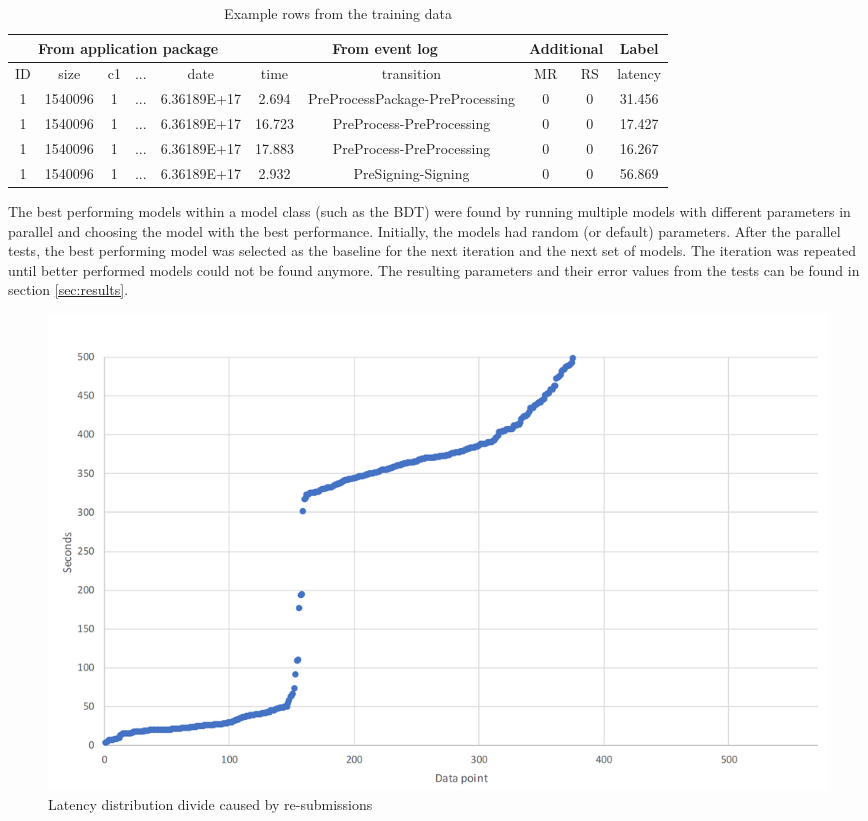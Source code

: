 \begin{table}[htb]
    \centering
    \begin{scriptsize}
    \begin{tabular}{|ccccc|cc|cc|c|}
        \hline
        \multicolumn{5}{|c|}{From application package} & \multicolumn{2}{c|}{From event log} & \multicolumn{2}{c|}{Additional} & Label\\
        \hline
        ID & size & c1 & ... & date & time & transition & MR & RS & latency\\
        \hline
        
        1 & 1540096 & 1 & ... & 6.36189E+17 & 2.694  & PreProcessPackage-PreProcessing & 0 & 0 & 31.456  \\
        1 & 1540096 & 1 & ... & 6.36189E+17 & 16.723 & PreProcess-PreProcessing        & 0 & 0 & 17.427 \\
        1 & 1540096 & 1 & ... & 6.36189E+17 & 17.883 & PreProcess-PreProcessing        & 0 & 0 & 16.267 \\
        1 & 1540096 & 1 & ... & 6.36189E+17 & 2.932  & PreSigning-Signing              & 0 & 0 & 56.869  \\
        
        \hline
    \end{tabular}
    \end{scriptsize}
    \caption{Example rows from the training data}
    \label{tab:examplerows}
\end{table}

The best performing models within a model class (such as the BDT) were found by running multiple models with different parameters in parallel and choosing the model with the best performance.
Initially, the models had random (or default) parameters.
After the parallel tests, the best performing model was selected as the baseline for the next iteration and the next set of models.
The iteration was repeated until better performed models could not be found anymore.
The resulting parameters and their error values from the tests can be found in section \ref{sec:results}.

\begin{figure}[p]
    \centering \includegraphics[width=0.9\linewidth]{gfx/graphs/resubmissions.png}
    \caption{Latency distribution divide caused by re-submissions}
    \label{fig:resubmissions}
\end{figure}

